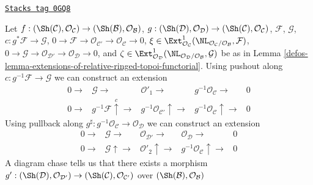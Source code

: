 \begin{remark}
\label{defos-remark-extensions-of-relative-ringed-topoi-functorial}
\href{https://stacks.math.columbia.edu/tag/0GQ8}{\texttt{Stacks tag 0GQ8}}

Let $f : (\Sh(\mathcal{C}), \mathcal{O}_\mathcal{C}) \to
(\Sh(\mathcal{B}), \mathcal{O}_\mathcal{B})$,
$g : (\Sh(\mathcal{D}), \mathcal{O}_\mathcal{D}) \to
(\Sh(\mathcal{C}), \mathcal{O}_\mathcal{C})$,
$\mathcal{F}$,
$\mathcal{G}$,
$c : g^*\mathcal{F} \to \mathcal{G}$,
$0 \to \mathcal{F} \to \mathcal{O}_{\mathcal{C}'} \to
\mathcal{O}_\mathcal{C} \to 0$,
$\xi \in \Ext^1_{\mathcal{O}_\mathcal{C}}(
\NL_{\mathcal{O}_\mathcal{C}/\mathcal{O}_\mathcal{B}}, \mathcal{F})$,
$0 \to \mathcal{G} \to \mathcal{O}_{\mathcal{D}'} \to
\mathcal{O}_\mathcal{D} \to 0$, and
$\zeta \in \Ext^1_{\mathcal{O}_\mathcal{D}}(
\NL_{\mathcal{O}_\mathcal{D}/\mathcal{O}_\mathcal{B}}, \mathcal{G})$
be as in Lemma \ref{defos-lemma-extensions-of-relative-ringed-topoi-functorial}.
Using pushout along $c : g^{-1}\mathcal{F} \to \mathcal{G}$
we can construct an extension
$$
\begin{array}{ccccc}0 \longrightarrow & \mathcal{G} \longrightarrow & \mathcal{O}'_1 \longrightarrow & g^{-1}\mathcal{O}_\mathcal{C} \longrightarrow & 0 \\ 0 \longrightarrow & g^{-1}\mathcal{F} \overset{c}{\uparrow}\longrightarrow & g^{-1}\mathcal{O}_{\mathcal{C}'} \uparrow\longrightarrow & g^{-1}\mathcal{O}_\mathcal{C} \uparrow\longrightarrow & 0\end{array}
$$
Using pullback along
$g^\sharp : g^{-1}\mathcal{O}_\mathcal{C} \to \mathcal{O}_\mathcal{D}$
we can construct an extension
$$
\begin{array}{ccccc}0 \longrightarrow & \mathcal{G} \longrightarrow & \mathcal{O}_{\mathcal{D}'} \longrightarrow & \mathcal{O}_\mathcal{D} \longrightarrow & 0 \\ 0 \longrightarrow & \mathcal{G} \uparrow\longrightarrow & \mathcal{O}'_2 \uparrow\longrightarrow & g^{-1}\mathcal{O}_\mathcal{C} \uparrow\longrightarrow & 0\end{array}
$$
A diagram chase tells us that there exists a morphism
$g' : (\Sh(\mathcal{D}), \mathcal{O}_{\mathcal{D}'}) \to
(\Sh(\mathcal{C}), \mathcal{O}_{\mathcal{C}'})$
over $(\Sh(\mathcal{B}), \mathcal{O}_\mathcal{B})$

\end{remark}
